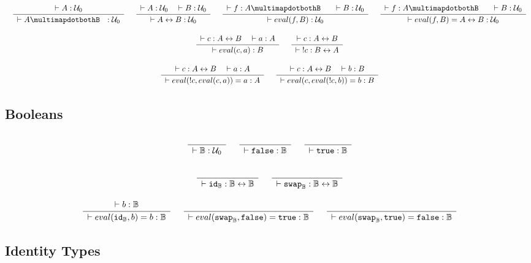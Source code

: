 \documentclass[format=acmlarge,review,natbib]{acmart}
\newcommand{\invc}[1]{!#1}
\newcommand{\evalone}[2]{eval(#1,#2)}
\newcommand{\idc}{\mathtt{id}}
\newcommand{\swapc}{\mathtt{swap}}
\newcommand{\iso}{\leftrightarrow}
\newcommand{\piso}{\multimapdotbothB~~}
\newcommand{\fc}{\mathtt{false}}
\newcommand{\tc}{\mathtt{true}}
\newcommand{\boolt}{\mathbb{B}}
\newcommand{\uzero}{\mathcal{U}_0}
\newcommand{\Rule}[2]{
\makebox{
$\displaystyle
\frac{\begin{array}{l}#1\\\end{array}}
{\begin{array}{l}#2\\\end{array}}$}}
\newcommand{\proves}{\vdash}
\newcommand{\jdg}[3]{#1 \proves #2 : #3}
\begin{document}
\[\begin{array}{c}
\Rule{\jdg{}{A}{\uzero}}
        {\jdg{}{A\piso}{\uzero}}
\quad
\Rule{\jdg{}{A}{\uzero}
         \quad \jdg{}{B}{\uzero}}
        {\jdg{}{A\iso B}{\uzero}}
\quad
\Rule{\jdg{}{f}{A \piso}
         \quad\jdg{}{B}{\uzero}}
        {\jdg{}{\evalone{f}{B}}{\uzero}}
\quad
\Rule{\jdg{}{f}{A \piso}
         \quad\jdg{}{B}{\uzero}}
        {\jdg{}{\evalone{f}{B} = A \iso B}{\uzero}}
\\
\\
\Rule{\jdg{}{c}{A \iso B}
         \quad\jdg{}{a}{A}}
        {\jdg{}{\evalone{c}{a}}{B}}
\quad
\Rule{\jdg{}{c}{A \iso B}}
        {\jdg{}{\;\invc{c}}{B \iso A}}
\\
\\
\Rule{\jdg{}{c}{A \iso B}
         \quad\jdg{}{a}{A}}
        {\jdg{}{\evalone{\invc{c}}{\evalone{c}{a}} = a}{A}}
\quad
\Rule{\jdg{}{c}{A \iso B}
         \quad\jdg{}{b}{B}}
        {\jdg{}{\evalone{c}{\evalone{\invc{c}}{b}} = b}{B}}
\end{array}\]

\subsection{Booleans}

\[\begin{array}{c}
\Rule{}{\jdg{}{\boolt}{\uzero}}
\quad
\Rule{}{\jdg{}{\fc}{\boolt}}
\quad
\Rule{}{\jdg{}{\tc}{\boolt}}
\\
\\
\Rule{}{\jdg{}{\idc_{\boolt}}{\boolt\iso\boolt}}
\quad
\Rule{}{\jdg{}{\swapc_{\boolt}}{\boolt\iso\boolt}}
\\
\\
\Rule{\jdg{}{b}{\boolt}}
        {\jdg{}{\evalone{\idc_{\boolt}}{b} = b}{\boolt}}
\quad
\Rule{}
        {\jdg{}{\evalone{\swapc_{\boolt}}{\fc} = \tc}{\boolt}}
\quad
\Rule{}
        {\jdg{}{\evalone{\swapc_{\boolt}}{\tc} = \fc}{\boolt}}
\end{array}\]

\subsection{Identity Types}
\end{document}
